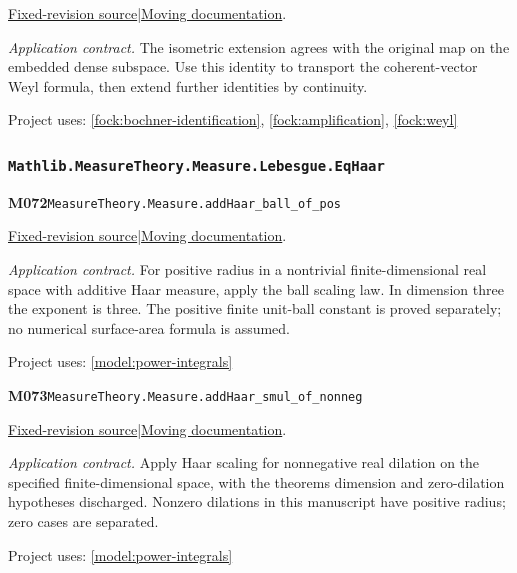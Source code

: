 \documentclass[11pt,a4paper]{article}
\theoremstyle{definition}
\theoremstyle{remark}
\begin{document}
\href{https://github.com/leanprover-community/mathlib4/blob/9bac2d0692944a775113f7c130fd5e5b4608a854/Mathlib/Analysis/Normed/Operator/Extend.lean}{Fixed-revision source}\quad|\quad\href{https://leanprover-community.github.io/mathlib4_docs/Mathlib/Analysis/Normed/Operator/Extend.html#LinearMap.extendOfIsometry_eq}{Moving documentation}.\par
\noindent\textit{Application contract.} The isometric extension agrees with the original map on the embedded dense subspace. Use this identity to transport the coherent-vector Weyl formula, then extend further identities by continuity.\par
{\small Project uses: \ref{fock:bochner-identification}, \ref{fock:amplification}, \ref{fock:weyl}}\par\medskip

\subsubsection*{\nolinkurl{Mathlib.MeasureTheory.Measure.Lebesgue.EqHaar}}
\noindent\textbf{M072}\label{base:M072}\quad\nolinkurl{MeasureTheory.Measure.addHaar_ball_of_pos}

\href{https://github.com/leanprover-community/mathlib4/blob/9bac2d0692944a775113f7c130fd5e5b4608a854/Mathlib/MeasureTheory/Measure/Lebesgue/EqHaar.lean}{Fixed-revision source}\quad|\quad\href{https://leanprover-community.github.io/mathlib4_docs/Mathlib/MeasureTheory/Measure/Lebesgue/EqHaar.html#MeasureTheory.Measure.addHaar_ball_of_pos}{Moving documentation}.\par
\noindent\textit{Application contract.} For positive radius in a nontrivial finite-dimensional real space with additive Haar measure, apply the ball scaling law. In dimension three the exponent is three. The positive finite unit-ball constant is proved separately; no numerical surface-area formula is assumed.\par
{\small Project uses: \ref{model:power-integrals}}\par\medskip

\noindent\textbf{M073}\label{base:M073}\quad\nolinkurl{MeasureTheory.Measure.addHaar_smul_of_nonneg}

\href{https://github.com/leanprover-community/mathlib4/blob/9bac2d0692944a775113f7c130fd5e5b4608a854/Mathlib/MeasureTheory/Measure/Lebesgue/EqHaar.lean}{Fixed-revision source}\quad|\quad\href{https://leanprover-community.github.io/mathlib4_docs/Mathlib/MeasureTheory/Measure/Lebesgue/EqHaar.html#MeasureTheory.Measure.addHaar_smul_of_nonneg}{Moving documentation}.\par
\noindent\textit{Application contract.} Apply Haar scaling for nonnegative real dilation on the specified finite-dimensional space, with the theorem\textquotesingle s dimension and zero-dilation hypotheses discharged. Nonzero dilations in this manuscript have positive radius; zero cases are separated.\par
{\small Project uses: \ref{model:power-integrals}}\par\medskip
\end{document}
